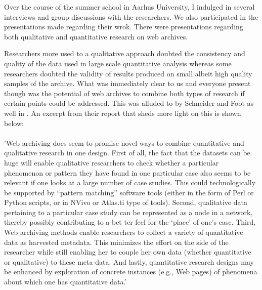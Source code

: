 Over the course of the summer school in Aarhus University, I indulged in several interviews and group discussions with the researchers. We also participated in the presentations made regarding their wrok. There were presentations regarding both qualitative and quantitative research on web archives. 

Researchers more used to a qualitative approach doubted the consistency and quality of the data used in large scale quantitative analysis whereas some researchers doubted the validity of results produced on small albeit high quality samples of the archive. What was immediately clear to us and everyone present though was the potential of web archives to combine both types of research if certain points could be addressed. This was alluded to by Schneider and Foot as well in \cite{schneider200911}. An excerpt from their report that sheds more light on this is shown below:

\paragraph{} %
\label{par:}

'Web archiving does seem to promise novel ways to combine quantitative and qualitative research in one design. First of all, the fact that the datasets can be huge will enable qualitative researchers to check whether a particular phenomenon or pattern they have found in one particular case also seems to be relevant if one looks at a large number of case studies. This could technologically be supported by “pattern matching” software tools (either in the form of Perl or Python scripts, or in NVivo or Atlas.ti type of tools). Second, qualitative data pertaining to a particular case study can be represented as a node in a network, thereby possibly contributing to a bet ter feel for the ‘place’ of one’s case. Third, Web archiving methods enable researchers to collect a variety of quantitative data as harvested metadata. This minimizes the effort on the side of the researcher while still enabling her to couple her own data (whether quantitative or qualitative) to these meta-data. And lastly, quantitative research designs may be enhanced by exploration of concrete instances (e.g., Web pages) of phenomena about which one has quantitative data.'


